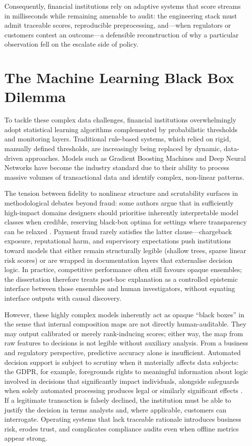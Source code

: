 Consequently, financial institutions rely on adaptive systems that score streams in milliseconds while remaining amenable to audit: the engineering stack must admit traceable scores, reproducible preprocessing, and—when regulators or customers contest an outcome—a defensible reconstruction of why a particular observation fell on the escalate side of policy.

\section{The Machine Learning Black Box Dilemma}
To tackle these complex data challenges, financial institutions overwhelmingly adopt statistical learning algorithms complemented by probabilistic thresholds and monitoring layers. Traditional rule-based systems, which relied on rigid, manually defined thresholds, are increasingly being replaced by dynamic, data-driven approaches. Models such as Gradient Boosting Machines and Deep Neural Networks have become the industry standard due to their ability to process massive volumes of transactional data and identify complex, non-linear patterns.

The tension between fidelity to nonlinear structure and scrutability surfaces in methodological debates beyond fraud: some authors argue that in sufficiently high-impact domains designers should prioritise inherently interpretable model classes when credible, reserving black-box optima for settings where transparency can be relaxed \cite{rudin_stopexplaining2019}. Payment fraud rarely satisfies the latter clause—chargeback exposure, reputational harm, and supervisory expectations push institutions toward models that either remain structurally legible (shallow trees, sparse linear risk scores) or are wrapped in documentation layers that externalise decision logic. In practice, competitive performance often still favours opaque ensembles; the dissertation therefore treats post-hoc explanation as a controlled epistemic interface between those ensembles and human investigators, without equating interface outputs with causal discovery.

However, these highly complex models inherently act as opaque ``black boxes'' in the sense that internal composition maps are not directly human-auditable. They may output calibrated or merely rank-inducing scores; either way, the map from raw features to decisions is not legible without auxiliary analysis. From a business and regulatory perspective, predictive accuracy alone is insufficient. Automated decision support is subject to scrutiny when it materially affects data subjects: the GDPR, for example, foregrounds rights to meaningful information about logic involved in decisions that significantly impact individuals, alongside safeguards when solely automated processing produces legal or similarly significant effects \cite{gdpr_text}. If a legitimate transaction is falsely declined, the institution must be able to justify the decision in terms analysts and, where applicable, customers can interrogate. Operating systems that lack traceable rationale introduces business risk, erodes trust, and complicates compliance audits even when offline metrics appear strong.

